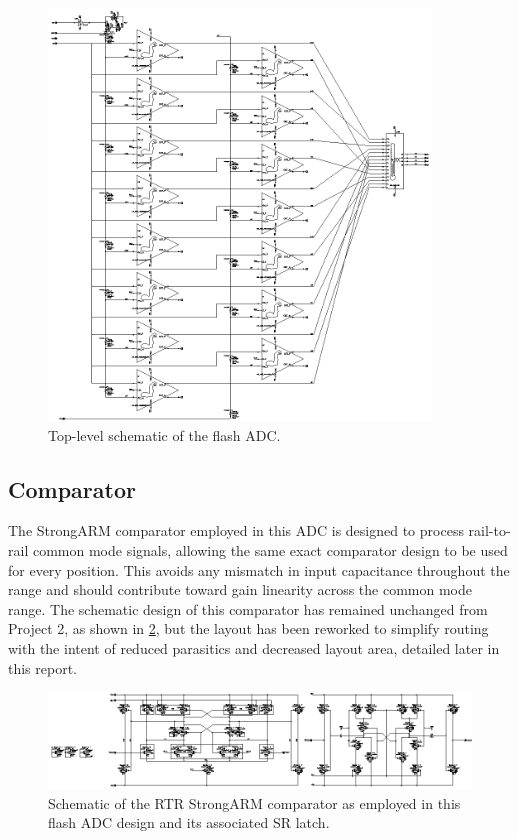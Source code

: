 \documentclass[11pt,letterpaper]{article}
\begin{document}
\begin{figure}[t!]
		\centering
		\includegraphics[width=4in]{flash.eps}
		\caption{Top-level schematic of the flash ADC.}\label{Fig:flash_sch}
\end{figure}

\subsection{Comparator}

The StrongARM comparator employed in this ADC is designed to process rail-to-rail common mode signals, allowing the same exact comparator design to be used for every position. This avoids any mismatch in input capacitance throughout the range and should contribute toward gain linearity across the common mode range. The schematic design of this comparator has remained unchanged from Project 2, as shown in \cref{Fig:comaprator_v2_sch}, but the layout has been reworked to simplify routing with the intent of reduced parasitics and decreased layout area, detailed later in this report.

\begin{figure}[t!]
    \centering
    \includegraphics[width=\textwidth]{comp_full.eps}
    \caption{Schematic of the RTR StrongARM comparator as employed in this flash ADC design and its associated SR latch.}\label{Fig:comaprator_v2_sch}
\end{figure}
\end{document}
